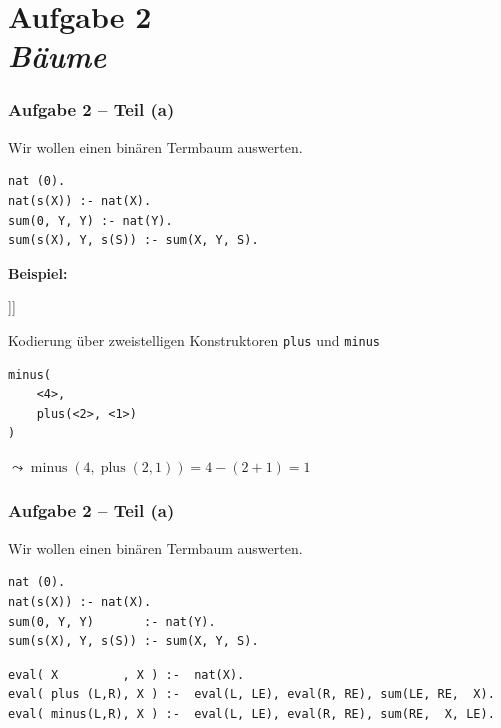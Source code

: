 \documentclass{beamer}
\begin{document}

\section{Aufgabe 2 \\ \itshape \normalsize Bäume}

\begin{frame}[fragile] \frametitle{Aufgabe 2 -- Teil (a)}
	\footnotesize
	Wir wollen einen binären Termbaum auswerten. 
	\begin{lstlisting}
nat (0).
nat(s(X)) :- nat(X).
sum(0, Y, Y) :- nat(Y).
sum(s(X), Y, s(S)) :- sum(X, Y, S).
	\end{lstlisting}

	\textbf{Beispiel:} 
	
	\begin{minipage}{\dimexpr0.35\linewidth-\fboxrule-\fboxsep}		
		\begin{forest}
			[\texttt{minus} [\texttt{<4>}] [\texttt{plus} [\texttt{<2>}] [\texttt{<1>}]]]
		\end{forest}
	\end{minipage}
	\begin{minipage}{\dimexpr0.65\linewidth-\fboxrule-\fboxsep}
		Kodierung über zweistelligen Konstruktoren \texttt{plus} und \texttt{minus} 
		\begin{lstlisting}[style=refutation]
minus( 
	<4>,
	plus(<2>, <1>)
)
		\end{lstlisting}
	\end{minipage}

	$\leadsto \operatorname{minus}(4, \operatorname{plus}(2,1)) = 4 - (2 + 1) = 1$
	
\end{frame}

\begin{frame}[fragile] \frametitle{Aufgabe 2 -- Teil (a)}
	\footnotesize
	
	Wir wollen einen binären Termbaum auswerten. 
	\begin{lstlisting}[basicstyle=\ttfamily\tiny]
nat (0).
nat(s(X)) :- nat(X).
sum(0, Y, Y)       :- nat(Y).
sum(s(X), Y, s(S)) :- sum(X, Y, S).
	\end{lstlisting}
	
	\pause
	
	\begin{lstlisting}[firstnumber=5, basicstyle=\ttfamily\tiny]
eval( X         , X ) :-  nat(X). 
eval( plus (L,R), X ) :-  eval(L, LE), eval(R, RE), sum(LE, RE,  X). 
eval( minus(L,R), X ) :-  eval(L, LE), eval(R, RE), sum(RE,  X, LE).
	\end{lstlisting}
\end{frame}
\end{document}
